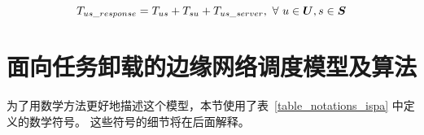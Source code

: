 
\begin{equation}
\label{formula_cloudtime}
{T}_{us\_response} = {T}_{us} + {T}_{su} + {T}_{us\_server},\ \forall \ u \in \boldsymbol{U}, s \in \boldsymbol{S}
\end{equation}

\section{面向任务卸载的边缘网络调度模型及算法}

为了用数学方法更好地描述这个模型，本节使用了表~\ref{table_notations_ispa} 中定义的数学符号。 这些符号的细节将在后面解释。

